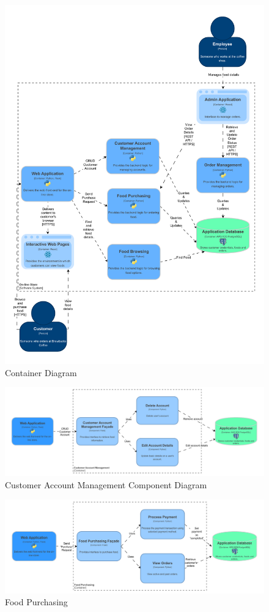 \documentclass{article}
\begin{document}
\begin{figure}
    \centering
    \includegraphics[width=0.80\linewidth]{model//c4//pdf/on-line-store-container-diagram_drawio.pdf}
    \caption{Container Diagram}
    \label{fig:container}
\end{figure}
\begin{figure}
    \centering
    \includegraphics[width=1\linewidth]{model//c4//pdf/customer_account_management_drawio.pdf}
    \caption{Customer Account Management Component Diagram}
    \label{fig:customer}
\end{figure}
\begin{figure}
    \centering
    \includegraphics[width=1\linewidth]{model//c4//pdf/food_purchasing_drawio.pdf}
    \caption{Food Purchasing}
    \label{fig:purchase}
\end{figure}
\end{document}
